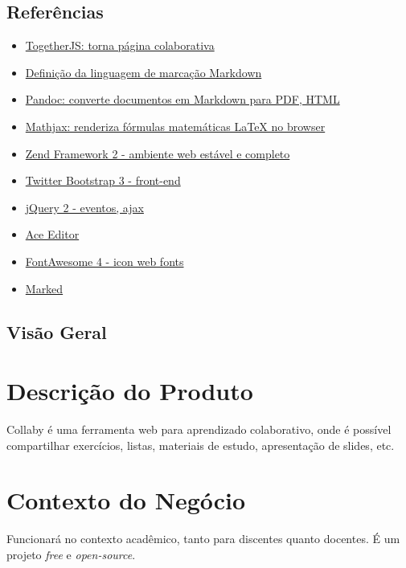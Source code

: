 \subsection{Referências}

\begin{itemize}
\item
  \href{https://togetherjs.com/}{TogetherJS: torna página colaborativa}
\item
  \href{http://daringfireball.net/projects/markdown/dingus}{Definição da
  linguagem de marcação Markdown}
\item
  \href{http://johnmacfarlane.net/pandoc/}{Pandoc: converte documentos
  em Markdown para PDF, HTML}
\item
  \href{http://www.mathjax.org/}{Mathjax: renderiza fórmulas matemáticas
  LaTeX no browser}
\item
  \href{http://framework.zend.com/zf2}{Zend Framework 2 - ambiente web
  estável e completo}
\item
  \href{http://getbootstrap.com/}{Twitter Bootstrap 3 - front-end}
\item
  \href{http://jquery.com/}{jQuery 2 - eventos, ajax}
\item
  \href{http://ace.c9.io/\#nav=about}{Ace Editor}
\item
  \href{http://FontAwesome.github.io/}{FontAwesome 4 - icon web fonts}
\item
  \href{https://github.com/chjj/marked}{Marked}
\end{itemize}
\subsection{Visão Geral}

\section{Descrição do Produto}

Collaby é uma ferramenta web para aprendizado colaborativo, onde é
possível compartilhar exercícios, listas, materiais de estudo,
apresentação de slides, etc.

\section{Contexto do Negócio}

Funcionará no contexto acadêmico, tanto para discentes quanto docentes.
É um projeto \emph{free} e \emph{open-source}.

